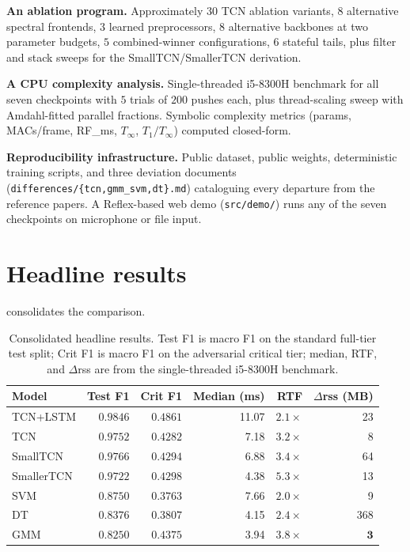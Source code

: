 \textbf{An ablation program.}
Approximately $30$ TCN ablation variants, $8$ alternative spectral frontends, $3$ learned preprocessors, $8$ alternative backbones at two parameter budgets, $5$ combined-winner configurations, $6$ stateful tails, plus filter and stack sweeps for the SmallTCN/SmallerTCN derivation.

\textbf{A CPU complexity analysis.}
Single-threaded i5-8300H benchmark for all seven checkpoints with $5$ trials of $200$ pushes each, plus thread-scaling sweep with Amdahl-fitted parallel fractions.
Symbolic complexity metrics (params, MACs/frame, RF\_ms, $T_\infty$, $T_1 / T_\infty$) computed closed-form.

\textbf{Reproducibility infrastructure.}
Public dataset, public weights, deterministic training scripts, and three deviation documents (\texttt{differences/\{tcn,gmm\_svm,dt\}.md}) cataloguing every departure from the reference papers.
A Reflex-based web demo (\texttt{src/demo/}) runs any of the seven checkpoints on microphone or file input.

\section{Headline results}
\label{sec:conclusion_headline}

 consolidates the comparison.

\begin{table}[h]
\centering
\small
\begin{tabular}{lrrrrr}
\toprule
\textbf{Model} & \textbf{Test F1} & \textbf{Crit F1} & \textbf{Median (ms)} & \textbf{RTF} & \textbf{$\Delta$rss (MB)} \\
\midrule
TCN+LSTM   & $\mathbf{0.9846}$ & $\mathbf{0.4861}$ & 11.07 & $2.1\times$ & 23 \\
TCN        & $0.9752$          & $0.4282$          & 7.18  & $3.2\times$ & 8 \\
SmallTCN   & $0.9766$          & $0.4294$          & 6.88  & $3.4\times$ & 64 \\
SmallerTCN & $0.9722$          & $0.4298$          & 4.38  & $\mathbf{5.3\times}$ & 13 \\
SVM        & $0.8750$          & $0.3763$          & 7.66  & $2.0\times$ & 9 \\
DT         & $0.8376$          & $0.3807$          & 4.15  & $2.4\times$ & 368 \\
GMM        & $0.8250$          & $0.4375$          & 3.94  & $3.8\times$ & $\mathbf{3}$ \\
\bottomrule
\end{tabular}
\caption{Consolidated headline results. Test F1 is macro F1 on the standard full-tier test split; Crit F1 is macro F1 on the adversarial critical tier; median, RTF, and $\Delta$rss are from the single-threaded i5-8300H benchmark.}
\label{tab:conclusion_headline}
\end{table}

